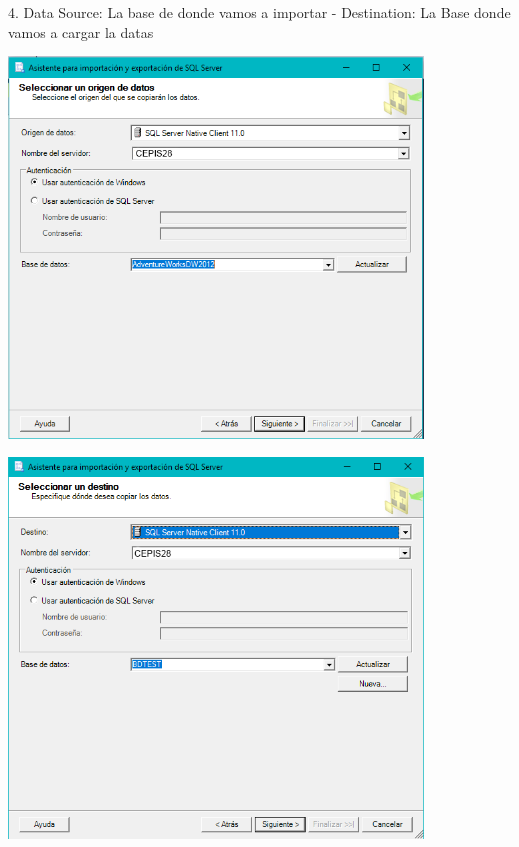 4. Data Source: La base de donde vamos a importar - Destination: La Base donde vamos a cargar la datas\\
	\begin{center}
	\includegraphics[width=11cm]{./Imagenes/img4}
	\end{center}	
	\begin{center}
	\includegraphics[width=11cm]{./Imagenes/img5}
	\end{center}	

